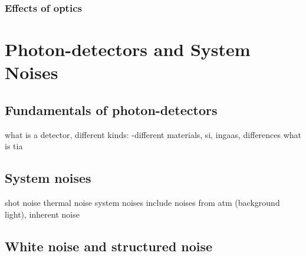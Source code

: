 \subsubsection{Effects of optics}



\section{Photon-detectors and System Noises}

\subsection{Fundamentals of photon-detectors}
what is a detector, different kinds: 
-different materials, si, ingaas, differences
what is tia
\subsection{System noises}
shot noise
thermal noise
system noises include noises from atm (background light), inherent noise 




\subsection{White noise and structured noise} \label{sec: noise}




